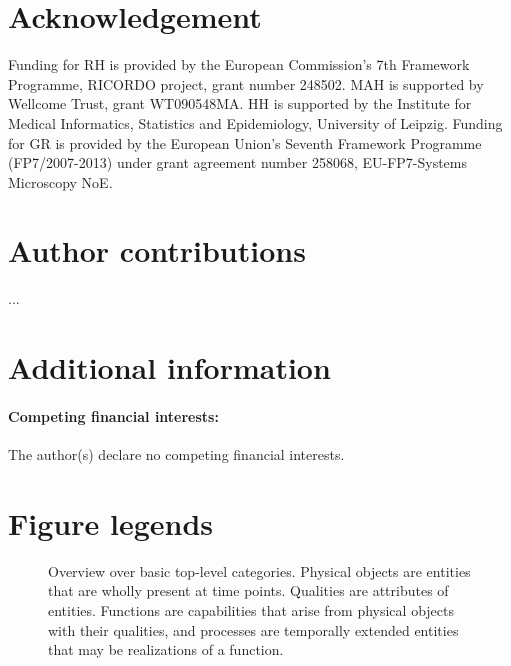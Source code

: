 \documentclass[11pt]{article}
\begin{document}
%

\clearpage
\section*{Acknowledgement}
Funding for RH is provided by the European Commission's 7th Framework
Programme, RICORDO project, grant number 248502. MAH is supported by
Wellcome Trust, grant WT090548MA. HH is supported by the Institute for
Medical Informatics, Statistics and Epidemiology, University of
Leipzig.  Funding for GR is provided by the European Union's Seventh
Framework Programme (FP7/2007-2013) under grant agreement number
258068, EU-FP7-Systems Microscopy NoE. 

\section*{Author contributions}
...

\section*{Additional information}
\paragraph*{Competing financial interests:} The author(s) declare no
competing financial interests.

\clearpage
\section*{Figure legends}
\begin{figure}[h]
  \centering
  \caption{Overview over basic top-level categories. Physical objects
    are entities that are wholly present at time points. Qualities are
    attributes of entities. Functions are capabilities that arise from
    physical objects with their qualities, and processes are
    temporally extended entities that may be realizations of a
    function.\label{fig:onto}}
\end{figure}
\end{document}
